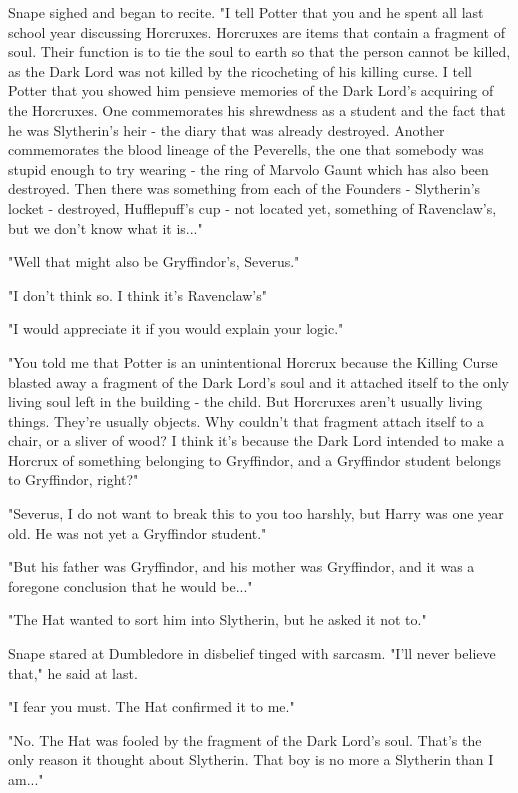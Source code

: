 Snape sighed and began to recite. "I tell Potter that you and he spent all last school year discussing Horcruxes. Horcruxes are items that contain a fragment of soul. Their function is to tie the soul to earth so that the person cannot be killed, as the Dark Lord was not killed by the ricocheting of his killing curse. I tell Potter that you showed him pensieve memories of the Dark Lord's acquiring of the Horcruxes. One commemorates his shrewdness as a student and the fact that he was Slytherin's heir - the diary that was already destroyed. Another commemorates the blood lineage of the Peverells, the one that somebody was stupid enough to try wearing - the ring of Marvolo Gaunt which has also been destroyed. Then there was something from each of the Founders - Slytherin's locket - destroyed, Hufflepuff's cup - not located yet, something of Ravenclaw's, but we don't know what it is..."

"Well that might also be Gryffindor's, Severus."

"I don't think so. I think it's Ravenclaw's"

"I would appreciate it if you would explain your logic."

"You told me that Potter is an unintentional Horcrux because the Killing Curse blasted away a fragment of the Dark Lord's soul and it attached itself to the only living soul left in the building - the child. But Horcruxes aren't usually living things. They're usually objects. Why couldn't that fragment attach itself to a chair, or a sliver of wood? I think it's because the Dark Lord intended to make a Horcrux of something belonging to Gryffindor, and a Gryffindor student belongs to Gryffindor, right?"

"Severus, I do not want to break this to you too harshly, but Harry was one year old. He was not yet a Gryffindor student."

"But his father was Gryffindor, and his mother was Gryffindor, and it was a foregone conclusion that he would be..."

"The Hat wanted to sort him into Slytherin, but he asked it not to."

Snape stared at Dumbledore in disbelief tinged with sarcasm. "I'll never believe that," he said at last.

"I fear you must. The Hat confirmed it to me."

"No. The Hat was fooled by the fragment of the Dark Lord's soul. That's the only reason it thought about Slytherin. That boy is no more a Slytherin than I am..."

